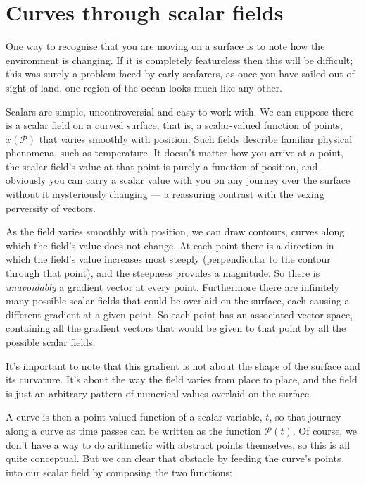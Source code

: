 \section{Curves through scalar fields}

One way to recognise that you are moving on a surface is to note how the environment is changing. If it is completely featureless then this will be difficult; this was surely a problem faced by early seafarers, as once you have sailed out of sight of land, one region of the ocean looks much like any other.

Scalars are simple, uncontroversial and easy to work with. We can suppose there is a scalar field on a curved surface, that is, a scalar-valued function of points, $x(\mathcal{P})$ that varies smoothly with position. Such fields describe familiar physical phenomena, such as temperature. It doesn't matter how you arrive at a point, the scalar field's value at that point is purely a function of position, and obviously you can carry a scalar value with you on any journey over the surface without it mysteriously changing --- a reassuring contrast with the vexing perversity of vectors.

As the field varies smoothly with position, we can draw contours, curves along which the field's value does not change. At each point there is a direction in which the field's value increases most steeply (perpendicular to the contour through that point), and the steepness provides a magnitude. So there is \textit{unavoidably} a gradient vector at every point. Furthermore there are infinitely many possible scalar fields that could be overlaid on the surface, each causing a different gradient at a given point. So each point has an associated vector space, containing all the gradient vectors that would be given to that point by all the possible scalar fields.

It's important to note that this gradient is not about the shape of the surface and its curvature. It's about the way the field varies from place to place, and the field is just an arbitrary pattern of numerical values overlaid on the surface.

A curve is then a point-valued function of a scalar variable, $t$, so that journey along a curve as time passes can be written as the function $\mathcal{P}(t)$. Of course, we don't have a way to do arithmetic with abstract points themselves, so this is all quite conceptual. But we can clear that obstacle by feeding the curve's points into our scalar field by composing the two functions:


